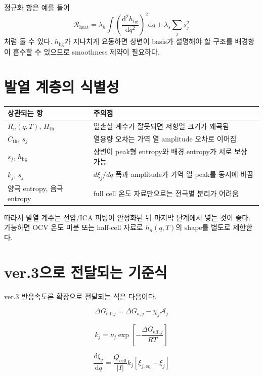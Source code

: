\documentclass[11pt,a4paper]{article}
\newcommand{\dd}{\mathrm{d}}
\newcommand{\eff}{\mathrm{eff}}
\newcommand{\eq}{\mathrm{eq}}
\newcommand{\bg}{\mathrm{bg}}
\newcommand{\cell}{\mathrm{cell}}
\begin{document}
정규화 항은 예를 들어
\begin{equation}
\mathcal R_{\mathrm{heat}}=\lambda_h\int\left(\frac{\dd^2h_{\bg}}{\dd q^2}\right)^2\dd q+\lambda_s\sum_j s_j^2
\label{eq:v2_heat_reg}
\end{equation}
처럼 둘 수 있다. \(h_{\bg}\)가 지나치게 요동하면 상변이 basis가 설명해야 할 구조를 배경항이 흡수할 수 있으므로 smoothness 제약이 필요하다.

\section{발열 계층의 식별성}
\begin{longtable}{p{}p{}}
\toprule
상관되는 항 & 주의점 \\
\midrule
\endhead
\(R_n(q,T)\), \(H_{\mathrm{th}}\) & 열손실 계수가 잘못되면 저항열 크기가 왜곡됨 \\
\(C_{\mathrm{th}}\), \(s_j\) & 열용량 오차는 가역 열 amplitude 오차로 이어짐 \\
\(s_j\), \(h_{\bg}\) & 상변이 peak형 entropy와 배경 entropy가 서로 보상 가능 \\
\(k_j\), \(s_j\) & \(d\xi_j/dq\) 폭과 amplitude가 가역 열 peak를 동시에 바꿈 \\
양극 entropy, 음극 entropy & full cell 온도 자료만으로는 전극별 분리가 어려움 \\
\bottomrule
\end{longtable}

따라서 발열 계수는 전압/ICA 피팅이 안정화된 뒤 마지막 단계에서 넣는 것이 좋다. 가능하면 OCV 온도 미분 또는 half-cell 자료로 \(h_n(q,T)\)의 shape를 별도로 제한한다.

\section{ver.3으로 전달되는 기준식}
ver.3 반응속도론 확장으로 전달되는 식은 다음이다.

\begin{equation}
\Delta G_{\eff,j}=\Delta G_{a,j}-\chi_j\mathcal A_j
\end{equation}

\begin{equation}
k_j=\nu_j\exp\left[-\frac{\Delta G_{\eff,j}}{RT}\right]
\end{equation}

\begin{equation}
\frac{\dd\xi_j}{\dd q}=\frac{Q_{\cell}}{|I|}k_j\left[\xi_{j,\eq}-\xi_j\right]
\end{equation}
\end{document}
